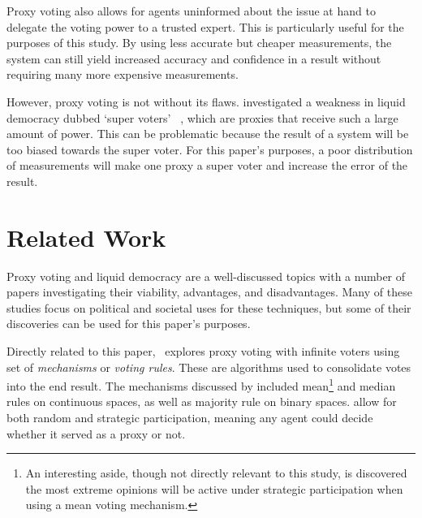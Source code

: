 Proxy voting also allows for agents uninformed about the issue at hand to
delegate the voting power to a trusted expert.
This is particularly useful for the purposes of this study.
By using less accurate but cheaper measurements, the system can still yield
increased accuracy and confidence in a result without requiring many more
expensive measurements.

However, proxy voting is not without its flaws.
 investigated a weakness in liquid democracy dubbed `super voters'
~\cite[para.~1.3]{Golz2021}, which are proxies that receive such a large amount
of power.
This can be problematic because the result of a system will be too biased
towards the super voter.
For this paper's purposes, a poor distribution of measurements will make one
proxy a super voter and increase the error of the result.



\section{Related Work}\label{sec:related-work}
Proxy voting and liquid democracy are a well-discussed topics with a number of
papers investigating their viability, advantages, and disadvantages.
Many of these studies focus on political and societal uses for these techniques,
but some of their discoveries can be used for this paper's purposes.

Directly related to this paper,\ \cite{Cohensius2017} explores proxy voting with
infinite voters using set of \textit{mechanisms} or \textit{voting rules}.
These are algorithms used to consolidate votes into the end result.
The mechanisms discussed by  included mean\footnote{An
    interesting aside, though not directly relevant to this
    study, is  discovered the most extreme opinions will be
    active under strategic participation when using a mean voting
    mechanism\cite[lemma~9]{Cohensius2017}.}
and median rules on continuous spaces, as well as majority rule on
binary spaces.
 allow for both random and strategic participation, meaning any
agent could decide whether it served as a proxy or not.

